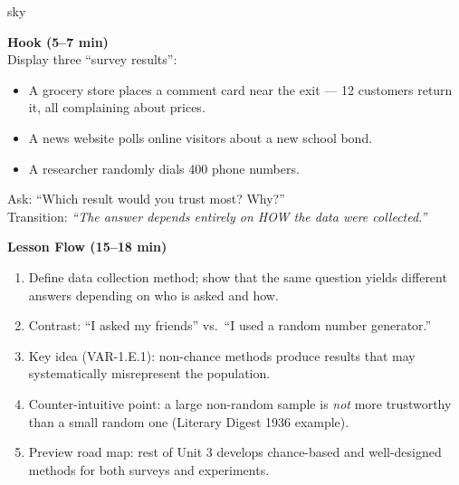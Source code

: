 \documentclass[10pt]{article}
\begin{document}
\begin{skillbox}{sky}
\begin{minipage}[t]{0.48\linewidth}
    \textbf{Hook (5--7 min)}\\
    Display three ``survey results'':
    \begin{itemize}
        \item A grocery store places a comment card near the exit --- 12 customers
              return it, all complaining about prices.
        \item A news website polls online visitors about a new school bond.
        \item A researcher randomly dials 400 phone numbers.
    \end{itemize}
    Ask: ``Which result would you trust most? Why?''\\
    Transition: \textit{``The answer depends entirely on HOW the data were collected.''}
\end{minipage}
\hfill
\begin{minipage}[t]{0.48\linewidth}
    \textbf{Lesson Flow (15--18 min)}
    \begin{enumerate}
        \item Define data collection method; show that the same question yields
              different answers depending on who is asked and how.
        \item Contrast: ``I asked my friends'' vs.\ ``I used a random number generator.''
        \item Key idea (VAR-1.E.1): non-chance methods produce results that may
              systematically misrepresent the population.
        \item Counter-intuitive point: a large non-random sample is \emph{not} more
              trustworthy than a small random one (Literary Digest 1936 example).
        \item Preview road map: rest of Unit 3 develops chance-based and well-designed
              methods for both surveys and experiments.
    \end{enumerate}
\end{minipage}
\end{skillbox}
\end{document}

